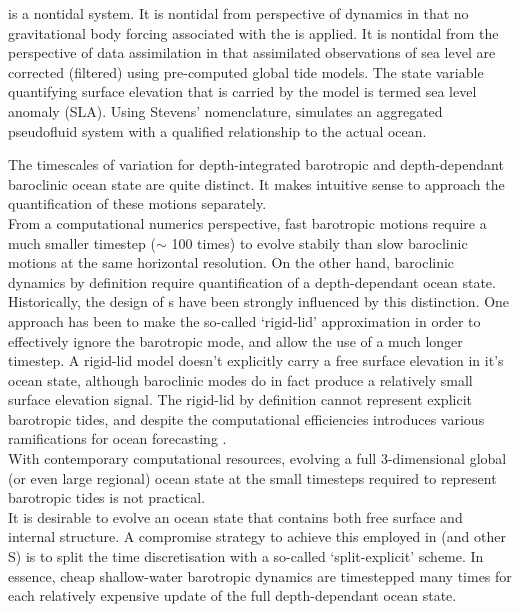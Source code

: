\BL{} is a nontidal system.  It is nontidal from perspective of \OGCM{} dynamics in that no gravitational body forcing associated with the \ATGP{} is applied.   It is nontidal from the perspective of data assimilation in that assimilated observations of sea level are corrected (filtered) using pre-computed global tide models.  The state variable quantifying surface elevation that is carried by the model is termed sea level anomaly (SLA). Using Stevens' nomenclature, \BL{} simulates an aggregated pseudofluid system with a qualified relationship to the actual ocean.


The timescales of variation for depth-integrated barotropic and depth-dependant baroclinic ocean state are quite distinct.   It makes intuitive sense to approach the quantification of these motions separately. \\
From a computational numerics perspective, fast barotropic motions require a much smaller timestep ($\sim$ 100 times) to evolve stabily than slow baroclinic motions at the same horizontal resolution.   On the other hand,  baroclinic dynamics by definition require quantification of a depth-dependant ocean state.\\
Historically, the design of \OGCM{}s have been strongly influenced by this distinction.   One approach has been to make the so-called `rigid-lid' approximation \cite[pp128]{gill1982atmosphere} in order to effectively ignore the barotropic mode, and allow the use of a much longer timestep.   A rigid-lid model doesn't explicitly carry a free surface elevation in it's ocean state, although baroclinic modes do in fact produce a relatively small surface elevation signal.   The rigid-lid by definition cannot represent explicit barotropic tides, and despite the computational efficiencies introduces various ramifications for ocean forecasting \cite[pp19]{Griffies:2004vs}.\\
With contemporary computational resources, evolving a full 3-dimensional global (or even large regional) ocean state at the small timesteps required to represent barotropic tides is not practical.\\
It is desirable to evolve an ocean state that contains both free surface and internal structure.  A compromise strategy to achieve this employed in \MOM{} (and other \OGCM{}S) is to split the time discretisation with a so-called `split-explicit' scheme.    In essence, cheap shallow-water barotropic dynamics are timestepped many times for each relatively expensive update of the full depth-dependant ocean state.  



